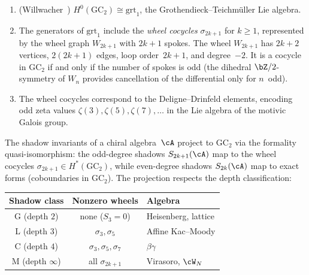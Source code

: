 \begin{theorem}
\label{thm:willwacher-wheels}
\begin{enumerate}[label=\textup{(\roman*)}]
\item \textup{(Willwacher~\cite{Willwacher15})}\quad
 $H^0(\mathrm{GC}_2) \cong \mathrm{grt}_1$, the
 Grothendieck--Teichm\"uller Lie algebra.
\item The generators of $\mathrm{grt}_1$ include the
 \emph{wheel cocycles} $\sigma_{2k+1}$ for $k \geq 1$, represented
 by the wheel graph $W_{2k+1}$ with $2k{+}1$ spokes. The wheel
 $W_{2k+1}$ has $2k{+}2$ vertices, $2(2k{+}1)$ edges, loop
 order~$2k{+}1$, and degree~$-2$. It is a cocycle in
 $\mathrm{GC}_2$ if and only if the number of spokes is odd
 \textup{(}the dihedral $\bZ/2$-symmetry of $W_n$ provides
 cancellation of the differential only for $n$~odd\textup{)}.
\item The wheel cocycles correspond to the Deligne--Drinfeld
 elements, encoding odd zeta values $\zeta(3), \zeta(5), \zeta(7),
 \ldots$ in the Lie algebra of the motivic Galois group.
\end{enumerate}
\end{theorem}

\begin{proposition}
\label{prop:shadow-gc2-bridge}
The shadow invariants of a chiral algebra~$\cA$ project to
$\mathrm{GC}_2$ via the formality quasi-isomorphism: the odd-degree
shadows $S_{2k+1}(\cA)$ map to the wheel cocycles
$\sigma_{2k+1} \in H^*(\mathrm{GC}_2)$, while even-degree shadows
$S_{2k}(\cA)$ map to exact forms \textup{(}coboundaries in
$\mathrm{GC}_2$\textup{)}. The projection respects the depth
classification:
\begin{center}
\renewcommand{\arraystretch}{1.15}
\begin{tabular}{ccl}
Shadow class & Nonzero wheels & Algebra \\
\hline
G \textup{(}depth $2$\textup{)} & none ($S_3 = 0$)
 & Heisenberg, lattice \\
L \textup{(}depth $3$\textup{)} & $\sigma_3, \sigma_5$
 & Affine Kac--Moody \\
C \textup{(}depth $4$\textup{)} & $\sigma_3, \sigma_5, \sigma_7$
 & $\beta\gamma$ \\
M \textup{(}depth $\infty$\textup{)} & all $\sigma_{2k+1}$
 & Virasoro, $\cW_N$
\end{tabular}
\end{center}
\end{proposition}

